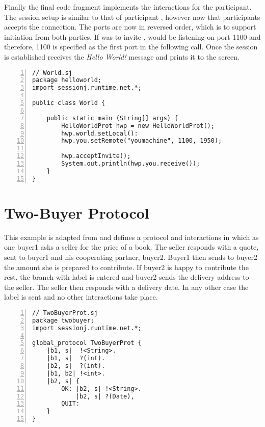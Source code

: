 Finally the final code fragment implements the interactions for the  participant. The session setup is similar to that of participant , however now that participants accepts the connection. The ports are now in reversed order, which is to support initiation from both parties. If  was to invite ,  would be listening on port 1100 and therefore, 1100 is specified as the first port in the following  call. Once the session is established  receives the \textit{Hello World!} message and prints it to the screen.

\begin{lstlisting}[basicstyle=\LISTINGSTYLE, numbers=left, caption=Implementation for participant \textit{world}]
// World.sj
package helloworld; 
import sessionj.runtime.net.*;
 
public class World {
	
	public static main (String[] args) {
		HelloWorldProt hwp = new HelloWorldProt();
		hwp.world.setLocal():
		hwp.you.setRemote("youmachine", 1100, 1950);
	
		hwp.acceptInvite();
		System.out.println(hwp.you.receive());
	} 
}
\end{lstlisting}

\section{Two-Buyer Protocol}

This example is adapted from \cite{multiparty_sess_types} and defines a protocol and interactions in which as one buyer1 asks a seller for the price of a book. The seller responds with a quote, sent to buyer1 and his cooperating partner, buyer2. Buyer1 then sends to buyer2 the amount she is prepared to contribute. If buyer2 is happy to contribute the rest, the branch with label  is entered and buyer2 sends the delivery address to the seller. The seller then responds with a delivery date. In any other case the label  is sent and no other interactions take place.

\begin{lstlisting}[basicstyle=\LISTINGSTYLE, numbers=left, caption=Global Declaration of \textit{TwoBuyerProt}]
// TwoBuyerProt.sj
package twobuyer; 
import sessionj.runtime.net.*;
 
global_protocol TwoBuyerProt {
	|b1, s|  !<String>.
	|b1, s|  ?(int).
	|b2, s|  ?(int).
	|b1, b2| !<int>.
	|b2, s| {
		OK: |b2, s| !<String>.
			|b2, s| ?(Date),
		QUIT:
	}	
}
\end{lstlisting}


